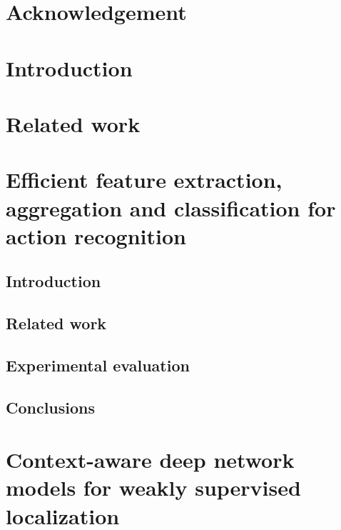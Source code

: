 \documentclass[%
	paper=A4,				%
	twoside=true,				%
	openright,				%
	parskip=full,				%
	chapterprefix=true,			%
	11pt,					%
	headings=normal,			%
	bibliography=totoc,			%
	listof=totoc,				%
	titlepage=on,				%
	captions=tableabove,			%
	draft=false,				%
]{scrreprt}%
\begin{document}
\chapter*{Acknowledgement}
\label{sec:acknowledgement}
\vspace*{-10mm}

\cleardoublepage

\setcounter{tocdepth}{1}
\tableofcontents
\cleardoublepage

\setcounter{page}{1}			%
\pagestyle{maincontentstyle} 		%


\chapter{Introduction}



\chapter{Related work}



\chapter{Efficient feature extraction, aggregation and classification for action recognition}
\section{Introduction}
\begin{abstract}\end{abstract}

\section{Related work}\label{sec:relatedwork}



\section{Experimental evaluation}\label{sec:experiments}

\section{Conclusions}



\chapter{Context-aware deep network models for weakly supervised localization}
\end{document}
